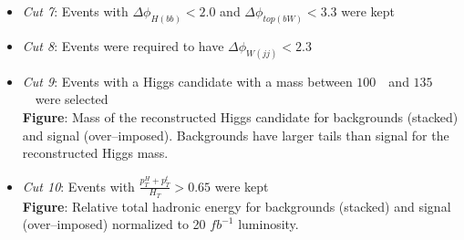 \begin{frame}{}
\vspace{-.2cm}

\begin{columns}
\begin{column}{.50\textwidth}
\begin{block}{}
\begin{itemize}\scriptsize
\item \textit{Cut 7}: Events with $\Delta \phi_{H(bb)}<2.0$ and $\Delta \phi_{top(bW)}<3.3$ were kept
\item \textit{Cut 8}: Events were required to have $\Delta \phi_{W(jj)}<2.3$ 
\item \textit{Cut 9}: Events with a Higgs candidate with a mass between $100$~\GeVcc~and $135$~\GeVcc~were selected\\
\textbf{Figure}: Mass of the reconstructed Higgs candidate for backgrounds (stacked) and signal (over--imposed). Backgrounds have larger tails than signal for the reconstructed Higgs mass.
\item \textit{Cut 10}: Events with $\frac{p_{T}^{H}+p_{T}^{t}}{H_{T}}>0.65$ were kept\\
\textbf{Figure}: Relative total hadronic energy for backgrounds (stacked) and signal (over--imposed) normalized to 20 $fb^{-1}$ luminosity.
\end{itemize}
\end{block}
\end{column}


\end{columns}
\end{frame}
